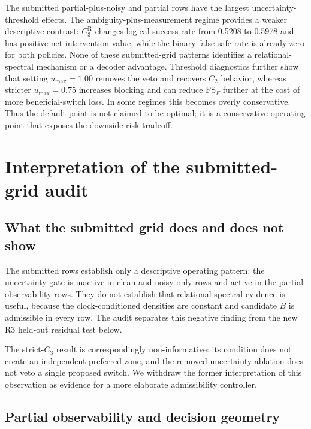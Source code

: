 \documentclass{iopjournal}
\begin{document}
The submitted partial-plus-noisy and partial rows have the largest
uncertainty-threshold effects. The ambiguity-plus-measurement regime provides a
weaker descriptive contrast: $C_3^{\mathrm R}$ changes logical-success rate from
0.5208 to 0.5978 and has positive net intervention value, while the binary
false-safe rate is already zero for both policies.  None of these submitted-grid
patterns identifies a relational-spectral mechanism or a decoder advantage.
Threshold diagnostics further show that setting $u_{\max}=1.00$ removes the veto
and recovers $C_2$ behavior, whereas stricter $u_{\max}=0.75$ increases blocking
and can reduce $\mathrm{FS}_F$ further at the cost of more beneficial-switch loss.
In some regimes this becomes overly conservative. Thus the default point is not
claimed to be optimal; it is a conservative operating point that exposes the
downside-risk tradeoff.

\section{Interpretation of the submitted-grid audit}\label{sec:discussion}

\subsection{What the submitted grid does and does not show}
\label{subsec:discussion-operating-zone}

The submitted rows establish only a descriptive operating pattern: the
uncertainty gate is inactive in clean and noisy-only rows and active in the
partial-observability rows.  They do not establish that relational spectral
evidence is useful, because the clock-conditioned densities are constant and
candidate $B$ is admissible in every row.  The audit separates this negative
finding from the new R3 held-out residual test below.

The strict-$C_3$ result is correspondingly non-informative: its condition does
not create an independent preferred zone, and the removed-uncertainty ablation
does not veto a single proposed switch.  We withdraw the former interpretation
of this observation as evidence for a more elaborate admissibility controller.

\subsection{Partial observability and decision geometry}
\label{subsec:discussion-partial-observability}
\end{document}
